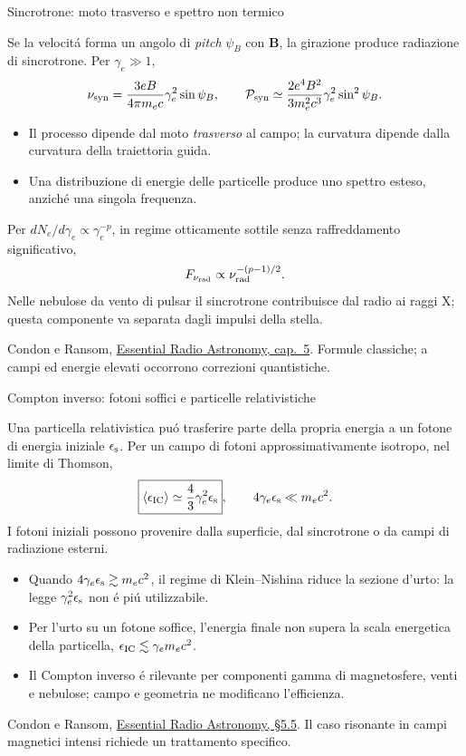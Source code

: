 \begin{frame}[t]{Sincrotrone: moto trasverso e spettro non termico}
\small\raggedright
Se la velocit\'a forma un angolo di \emph{pitch} $\psi_B$ con $\mathbf B$,
la girazione produce radiazione di sincrotrone. Per $\gamma_e\gg1$,
\[
\nu_{\rm syn}=\frac{3eB}{4\pi m_ec}\gamma_e^2\sin\psi_B,\qquad
\mathcal P_{\rm syn}\simeq
\frac{2e^4B^2}{3m_e^2c^3}\gamma_e^2\sin^2\psi_B.
\]
\begin{itemize}
\item Il processo dipende dal moto \emph{trasverso} al campo;
la curvatura dipende dalla curvatura della traiettoria guida.
\item Una distribuzione di energie delle particelle produce
uno spettro esteso, anzich\'e una singola frequenza.
\end{itemize}
Per $dN_e/d\gamma_e\propto\gamma_e^{-p}$, in regime otticamente sottile
senza raffreddamento significativo,
\[
F_{\nu_{\rm rad}}\propto\nu_{\rm rad}^{-(p-1)/2}.
\]
Nelle nebulose da vento di pulsar il sincrotrone contribuisce dal radio ai raggi X;
questa componente va separata dagli impulsi della stella.
\par\smallskip
\footnotesize Condon e Ransom, \href{https://www.cv.nrao.edu/~sransom/web/Ch5.html}{Essential Radio Astronomy, cap.~5}.
Formule classiche; a campi ed energie elevati occorrono correzioni quantistiche.
\end{frame}

\begin{frame}[t]{Compton inverso: fotoni soffici e particelle relativistiche}
\small\raggedright
Una particella relativistica pu\'o trasferire parte della propria energia
a un fotone di energia iniziale $\epsilon_{\rm s}$.
Per un campo di fotoni approssimativamente isotropo, nel limite di Thomson,
\[
\boxed{\langle\epsilon_{\rm IC}\rangle\simeq
\frac43\gamma_e^2\epsilon_{\rm s}},\qquad
4\gamma_e\epsilon_{\rm s}\ll m_ec^2.
\]
I fotoni iniziali possono provenire dalla superficie, dal sincrotrone
o da campi di radiazione esterni.
\begin{itemize}
\item Quando $4\gamma_e\epsilon_{\rm s}\gtrsim m_ec^2$,
il regime di Klein--Nishina riduce la sezione d'urto:
la legge $\gamma_e^2\epsilon_{\rm s}$ non \'e pi\'u utilizzabile.
\item Per l'urto su un fotone soffice, l'energia finale non supera
la scala energetica della particella, $\epsilon_{\rm IC}\lesssim\gamma_em_ec^2$.
\item Il Compton inverso \'e rilevante per componenti gamma di magnetosfere,
venti e nebulose; campo e geometria ne modificano l'efficienza.
\end{itemize}
\par\smallskip
\footnotesize Condon e Ransom, \href{https://www.cv.nrao.edu/~sransom/web/Ch5.html}{Essential Radio Astronomy, \S5.5}.
Il caso risonante in campi magnetici intensi richiede un trattamento specifico.
\end{frame}

